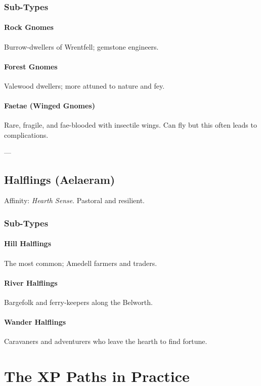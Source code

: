 \documentclass[11pt]{book}
\begin{document}
\subsection{Sub-Types}
\subsubsection{Rock Gnomes}
Burrow-dwellers of Wrentfell; gemstone engineers.  

\subsubsection{Forest Gnomes}
Valewood dwellers; more attuned to nature and fey.  

\subsubsection{Faetae (Winged Gnomes)}
Rare, fragile, and fae-blooded with insectile wings. Can fly but this often leads to complications.  

---

\section{Halflings (Aelaeram)}
Affinity: \emph{Hearth Sense}. Pastoral and resilient.  

\subsection{Sub-Types}
\subsubsection{Hill Halflings}
The most common; Amedell farmers and traders.  

\subsubsection{River Halflings}
Bargefolk and ferry-keepers along the Belworth.  

\subsubsection{Wander Halflings}
Caravaners and adventurers who leave the hearth to find fortune.   

\chapter{The XP Paths in Practice}
\end{document}
